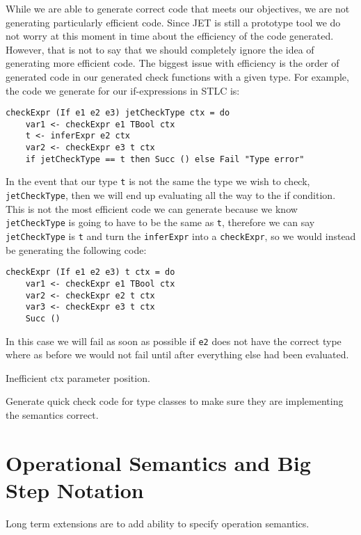 While we are able to generate correct code that meets our objectives, we are not generating particularly efficient code.
Since JET is still a prototype tool we do not worry at this moment in time about the efficiency of the code generated.
However, that is not to say that we should completely ignore the idea of generating more efficient code.
The biggest issue with efficiency is the order of generated code in our generated check functions with a given type.
For example, the code we generate for our if-expressions in STLC is:
\begin{lstlisting}
checkExpr (If e1 e2 e3) jetCheckType ctx = do
    var1 <- checkExpr e1 TBool ctx
    t <- inferExpr e2 ctx
    var2 <- checkExpr e3 t ctx
    if jetCheckType == t then Succ () else Fail "Type error"
\end{lstlisting}
In the event that our type \texttt{t} is not the same the type we wish to check, \texttt{jetCheckType}, then we will end up evaluating all the way to the if condition.
This is not the most efficient code we can generate because we know \texttt{jetCheckType} is going to have to be the same as \texttt{t}, therefore we can say \texttt{jetCheckType} is \texttt{t} and turn the \texttt{inferExpr} into a \texttt{checkExpr}, so we would instead be generating the following code:
\begin{lstlisting}
checkExpr (If e1 e2 e3) t ctx = do
    var1 <- checkExpr e1 TBool ctx
    var2 <- checkExpr e2 t ctx
    var3 <- checkExpr e3 t ctx
    Succ ()
\end{lstlisting}
In this case we will fail as soon as possible if \texttt{e2} does not have the correct type where as before we would not fail until after everything else had been evaluated.

Inefficient ctx parameter position.

Generate quick check code for type classes to make sure they are implementing the semantics correct.

\section{Operational Semantics and Big Step Notation}
Long term extensions are to add ability to specify operation semantics.
